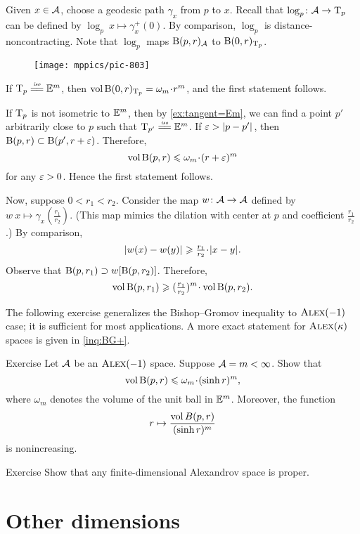 Given $x\in\mathcal{A}$, choose a geodesic path $\gamma_x$ from $p$ to $x$.
Recall that $\log_p\colon\mathcal{A}\to \mathrm{T}_p$ can be defined by $\log_p\:x\mapsto \gamma_x^+(0)$.
By comparison, $\log_p$ is distance-noncontracting.
Note that $\log_p$ maps $\mathrm{B}{}(p,r)_{\mathcal{A}}$ to $\mathrm{B}{}(0,r)_{\mathrm{T}_p}$.

\begin{wrapfigure}{r}{44 mm}
\vskip-0mm
\centering
\texttt{[image: mppics/pic-803]}
\vskip1mm
\end{wrapfigure}

If $\T_p\iso \EE^m$, then $\vol\oBall(0,r)_{\T_p}\z=\omega_m\cdot r^m$,
and the first statement follows.

If $\mathrm{T}_p$ is not isometric to $\mathbb{E}^m$, then by \ref{ex:tangent=Em}, we can find a point $p'$ arbitrarily close to $p$ such that $\T_{p'}\iso \EE^m$.
If $\varepsilon>|{p}-{p'}|_{}^{{}}$, then $\mathrm{B}{}(p,r)\subset \mathrm{B}{}(p',r+\varepsilon)$.
Therefore,
\[\vol \oBall(p,r)\le \omega_m\cdot (r+\eps)^m\]
for any $\varepsilon>0$.
Hence the first statement follows.

Now, suppose $0<r_1<r_2$.
Consider the map $w\colon \mathcal{A}\to \mathcal{A}$ defined by $w\:x\mapsto \gamma_x(\tfrac {r_1}{r_2})$.
(This map mimics the dilation with center at $p$ and coefficient $\tfrac {r_1}{r_2}$.)
By comparison,
\[\dist{w(x)}{w(y)}{}\ge \tfrac {r_1}{r_2}\cdot \dist{x}{y}{}.\]
Observe that $\mathrm{B}{}(p,r_1) \supset w[\mathrm{B}{}(p,r_2)]$.
Therefore, 
\[\vol \oBall(p,r_1)\ge (\tfrac {r_1}{r_2})^m\cdot\vol \oBall(p,r_2).\]
\qedsf

The following exercise generalizes the Bishop--Gromov inequality to $\textsc{Alex}(-1)$ case;
it is sufficient for most applications.
A more exact statement for $\textsc{Alex}(\kappa)$ spaces is given in \ref{inq:BG+}.



\begin{thm}{Exercise}\label{ex:BG}
Let $\mathcal{A}$ be an $\textsc{Alex}(-1)$ space.
Suppose $\mathcal{A}=m<\infty$.
Show that
\[\vol \oBall(p,r)\le \omega_m\cdot(\sinh r)^m,\]
where $\omega_m$ denotes the volume of the unit ball in $\mathbb{E}^m$.
Moreover, the function 
\[r\mapsto \frac{\operatorname{\rm vol}\nolimits B(p,r)}{(\sinh r)^m}\]
is nonincreasing.
\end{thm}

\begin{thm}{Exercise}\label{ex:diam-compact:proper}
Show that any finite-dimensional Alexandrov space is proper.

\end{thm}
\section{Other dimensions}\label{sec:all-dim}

